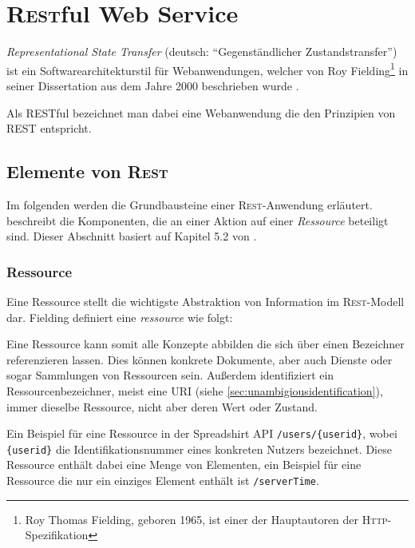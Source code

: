 \section{\textsc{Rest}ful Web Service}
\label{sec:rest}

\emph{Representational State Transfer} (deutsch: \enquote{Gegenständlicher Zustandstransfer}) ist ein Softwarearchitekturstil für Webanwendungen, welcher von Roy Fielding\footnote{Roy Thomas Fielding, geboren 1965, ist einer der Hauptautoren der \textsc{Http}-Spezifikation} in seiner Dissertation aus dem Jahre 2000  beschrieben wurde \cite[Kapitel 5][95 ff.]{fieldingDissertation}. 

Als \gls{RESTful} bezeichnet man dabei eine Webanwendung die den Prinzipien von \gls{REST} entspricht. 

\subsection{Elemente von \textsc{Rest}}

Im folgenden werden die Grundbausteine einer \textsc{Rest}-Anwendung erläutert.  beschreibt die Komponenten, die an einer Aktion auf einer \emph{Ressource} beteiligt sind. Dieser Abschnitt basiert auf Kapitel 5.2 von \cite[][S. 86 ff.]{fieldingDissertation}.

\subsubsection{Ressource}

Eine Ressource stellt die wichtigste Abstraktion von Information im \textsc{Rest}-Modell dar. Fielding definiert eine \emph{ressource} wie folgt:


Eine Ressource kann somit alle Konzepte abbilden die sich über einen Bezeichner referenzieren lassen. Dies können konkrete Dokumente, aber auch Dienste oder sogar Sammlungen von Ressourcen sein.
Außerdem identifiziert ein Ressourcenbezeichner, meist eine \gls{URI} (siehe \cref{sec:unambigiousidentification}), immer dieselbe Ressource, nicht aber deren Wert oder Zustand.

Ein Beispiel für eine Ressource in der Spreadshirt \gls{API} \texttt{/users/\{userid\}}, wobei \texttt{\{userid\}} die Identifikationsnummer eines konkreten Nutzers bezeichnet. Diese Ressource enthält dabei eine Menge von Elementen, ein Beispiel für eine Ressource die nur ein einziges Element enthält ist \texttt{/serverTime}. 

